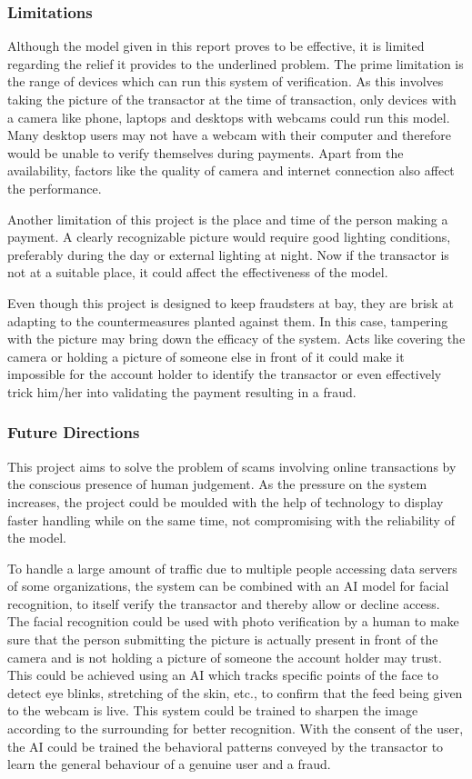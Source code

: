 \documentclass[12pt, oneside, a4paper]{article}
\begin{document}
\subsubsection{Limitations}
Although the model given in this report proves to be effective, it is limited regarding the relief it provides to the underlined problem. The prime limitation is the range of devices which can run this system of verification. As this involves taking the picture of the transactor at the time of transaction, only devices with a camera like phone, laptops and desktops with webcams could run this model. Many desktop users may not have a webcam with their computer and therefore would be unable to verify themselves during payments. Apart from the availability, factors like the quality of camera and internet connection also affect the performance.

Another limitation of this project is the place and time of the person making a payment. A clearly recognizable picture would require good lighting conditions, preferably during the day or external lighting at night. Now if the transactor is not at a suitable place, it could affect the effectiveness of the model.

Even though this project is designed to keep fraudsters at bay, they are brisk at adapting to the countermeasures planted against them. In this case, tampering with the picture may bring down the efficacy of the system. Acts like covering the camera or holding a picture of someone else in front of it could make it impossible for the account holder to identify the transactor or even effectively trick him/her into validating the payment resulting in a fraud.

\subsubsection{Future Directions}
 This project aims to solve the problem of scams involving online transactions by the conscious presence of human judgement. As the pressure on the system increases, the project could be moulded with the help of technology to display faster handling while on the same time, not compromising with the reliability of the model.
 
 To handle a large amount of traffic due to multiple people accessing data servers of some organizations, the system can be combined with an AI model for facial recognition, to itself verify the transactor and thereby allow or decline access. The facial recognition could be used with photo verification by a human to make sure that the person submitting the picture is actually present in front of the camera and is not holding a picture of someone the account holder may trust. This could be achieved using an AI which tracks specific points of the face to detect eye blinks, stretching of the skin, etc., to confirm that the feed being given to the webcam is live. This system could be trained to sharpen the image according to the surrounding for better recognition. With the consent of the user, the AI could be trained the behavioral patterns conveyed by the transactor to learn the general behaviour of a genuine user and a fraud.
 
\end{document}
